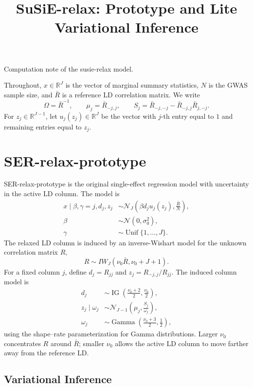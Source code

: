 \documentclass[11pt]{article}
\title{SuSiE-relax: Prototype and Lite Variational Inference}
\author{}
\date{}
\newcommand{\Rbar}{\bar R}
\newcommand{\Om}{\Omega}
\newcommand{\Unif}{\operatorname{Unif}}
\newcommand{\IG}{\operatorname{IG}}
\newcommand{\Gam}{\operatorname{Gamma}}
\newcommand{\Normal}{\mathcal N}
\begin{document}
\maketitle

Computation note of the susie-relax model.

Throughout, \(x\in\mathbb R^J\) is the vector of marginal summary
statistics, \(N\) is the GWAS sample size, and \(\Rbar\) is a reference
LD correlation matrix. We write
\[
\Om=\Rbar^{-1},\qquad
\mu_j=\Rbar_{-j,j},\qquad
S_j=\Rbar_{-j,-j}-\Rbar_{-j,j}\Rbar_{j,-j}.
\]
For \(z_j\in\mathbb R^{J-1}\), let \(u_j(z_j)\in\mathbb R^J\) be the
vector with \(j\)-th entry equal to \(1\) and remaining entries equal to
\(z_j\).

\section{SER-relax-prototype}

SER-relax-prototype is the original single-effect regression model with
uncertainty in the active LD column. The model is
\begin{align}
x\mid \beta,\gamma=j,d_j,z_j
&\sim
\Normal_J\left(\beta d_j u_j(z_j),\frac{\Rbar}{N}\right),\\
\beta&\sim \Normal(0,\sigma_0^2),\\
\gamma&\sim \Unif\{1,\ldots,J\}.
\end{align}
The relaxed LD column is induced by an inverse-Wishart model for the
unknown correlation matrix \(R\),
\[
R\sim IW_J(\nu_0\Rbar,\nu_0+J+1).
\]
For a fixed column \(j\), define \(d_j=R_{jj}\) and
\(z_j=R_{-j,j}/R_{jj}\). The induced column model is
\begin{align}
d_j&\sim
\IG\left(\frac{\nu_0+2}{2},\frac{\nu_0}{2}\right),\\
z_j\mid \omega_j
&\sim
\Normal_{J-1}\left(\mu_j,\frac{S_j}{\omega_j}\right),\\
\omega_j&\sim
\Gam\left(\frac{\nu_0+3}{2},\frac12\right),
\end{align}
using the shape--rate parameterization for Gamma distributions. Larger
\(\nu_0\) concentrates \(R\) around \(\Rbar\); smaller \(\nu_0\) allows
the active LD column to move farther away from the reference LD.

\subsection{Variational Inference}
\end{document}
